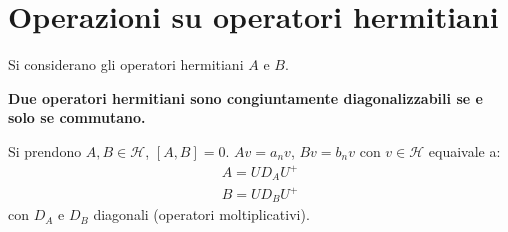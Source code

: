 \section{Operazioni su operatori hermitiani} %
Si considerano gli operatori hermitiani $A$ e $B$.

\textbf{Due operatori hermitiani sono congiuntamente diagonalizzabili se e solo se commutano.}

Si prendono $A,B\in \mathcal{H}$, $\left[A,B\right]=0$. $Av=a_nv$, $Bv=b_nv$ con $v\in \mathcal{H}$ equaivale a:
\begin{equation}\begin{split}
A=UD_AU^+ \\
B=UD_BU^+
\end{split}\end{equation}
con $D_A$ e $D_B$ diagonali (operatori moltiplicativi).

